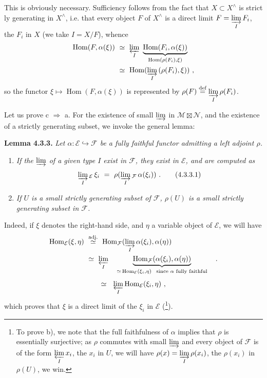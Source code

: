 \documentclass[11pt]{article}
\newcommand{\printedpage}[1]{\marginpar{\footnotesize p.~#1}}
\newcommand{\msp}[1]{\marginpar{\footnotesize [#1]}}
\newcommand{\Hom}{\operatorname{Hom}}
\begin{document}
\noindent This is obviously necessary. Sufficiency follows from the fact that $X\subset X^\wedge$ is strict%
\printedpage{10}%
\msp{page 67}%
ly generating in $X^\wedge$, i.e. that every object $F$ of $X^\wedge$ is a direct limit $F=\varinjlim\limits_I F_i$, the $F_i$ in $X$ (we take $I=X/F$), whence
\[
\begin{aligned}
\Hom(F,\alpha(\xi))\ &\simeq\ \varprojlim_I\ \underbrace{\Hom(F_i,\alpha(\xi))}_{\Hom(\rho(F_i),\xi)}\\
&\simeq\ \Hom(\varinjlim_I\,(\rho(F_i),\xi))\ ,
\end{aligned}
\]
so the functor $\xi\longmapsto\Hom(F,\alpha(\xi))$ is represented by $\rho(F)\overset{\text{def}}{=}\varinjlim\limits_I\rho(F_i)$.

\noindent Let us prove c $\Longrightarrow$ a. For the existence of small $\varinjlim$ in $\mathcal M\boxtimes\mathcal N$, and the existence of a strictly generating subset, we invoke the general lemma:

\noindent\textbf{Lemma 4.3.3.} \textit{Let $\alpha:\mathcal E\hookrightarrow\mathcal F$ be a fully faithful functor admitting a left adjoint $\rho$.}
\begin{enumerate}[label={}]
\item[\textcircled{a}] \textit{If the $\varinjlim$ of a given type $I$ exist in $\mathcal F$, they exist in $\mathcal E$, and are computed as}
\[
\varinjlim_I{}_{\mathcal E}\,\xi_i\ =\ \rho(\varinjlim_I{}_{\mathcal F}\,\alpha(\xi_i))\ .
\tag*{(4.3.3.1)}
\]
\item[\textcircled{b}] \textit{If $U$ is a small strictly generating subset of $\mathcal F$, $\rho(U)$ is a small strictly generating subset in $\mathcal F$.}
\end{enumerate}

\noindent Indeed, if $\xi$ denotes the right-hand side, and $\eta$ a variable object of $\mathcal E$, we will have
\[
\begin{aligned}
\Hom_{\mathcal E}(\xi,\eta)\ &\overset{\text{adj.}}{\simeq}\ \Hom_{\mathcal F}(\varinjlim_I\alpha(\xi_i),\alpha(\eta))\\
&\simeq\ \varprojlim_I\quad\underbrace{\Hom_{\mathcal F}(\alpha(\xi_i),\alpha(\eta))}_{\simeq\,\Hom_{\mathcal E}(\xi_i,\eta)\ \ \text{since $\alpha$ fully faithful}}\quad .
\end{aligned}
\]
\msp{page 68}
\[
\simeq\ \ \varprojlim_I\Hom_{\mathcal E}(\xi_i,\eta)\ ,
\]
which proves that $\xi$ is a direct limit of the $\xi_i$ in $\mathcal E$ (\footnote{To prove b), we note that the full faithfulness of $\alpha$ implies that $\rho$ is essentially surjective; as $\rho$ commutes with small $\varinjlim$ and every object of $\mathcal F$ is of the form $\varprojlim\limits_I x_i$, the $x_i$ in $U$, we will have $\rho(x)=\varinjlim\limits_I\rho(x_i)$, the $\rho(x_i)$ in $\rho(U)$, we win.}).
\end{document}
